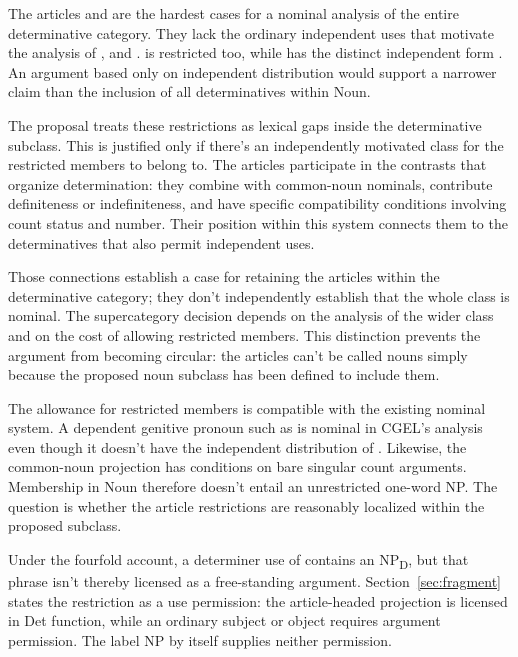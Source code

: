 \documentclass[12pt]{article}
\begin{document}
The articles  and  are the hardest cases for a nominal analysis of the entire determinative category. They lack the ordinary independent uses that motivate the analysis of ,  and .  is restricted too, while  has the distinct independent form  \citep[371--372, 410--411]{huddleston2002}. An argument based only on independent distribution would support a narrower claim than the inclusion of all determinatives within Noun.

The proposal treats these restrictions as lexical gaps inside the determinative subclass. This is justified only if there's an independently motivated class for the restricted members to belong to. The articles participate in the contrasts that organize determination: they combine with common-noun nominals, contribute definiteness or indefiniteness, and have specific compatibility conditions involving count status and number. Their position within this system connects them to the determinatives that also permit independent uses.

Those connections establish a case for retaining the articles within the determinative category; they don't independently establish that the whole class is nominal. The supercategory decision depends on the analysis of the wider class and on the cost of allowing restricted members. This distinction prevents the argument from becoming circular: the articles can't be called nouns simply because the proposed noun subclass has been defined to include them.

The allowance for restricted members is compatible with the existing nominal system. A dependent genitive pronoun such as  is nominal in CGEL's analysis even though it doesn't have the independent distribution of  \citep[470--471]{huddleston2002}. Likewise, the common-noun projection has conditions on bare singular count arguments. Membership in Noun therefore doesn't entail an unrestricted one-word NP. The question is whether the article restrictions are reasonably localized within the proposed subclass.

Under the fourfold account, a determiner use of  contains an NP\textsubscript{D}, but that phrase isn't thereby licensed as a free-standing argument. Section~\ref{sec:fragment} states the restriction as a use permission: the article-headed projection is licensed in Det function, while an ordinary subject or object requires argument permission. The label NP by itself supplies neither permission.
\end{document}
